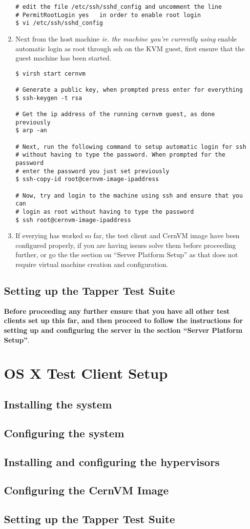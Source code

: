 \begin{enumerate}
\begin{lstlisting}
# edit the file /etc/ssh/sshd_config and uncomment the line 
# PermitRootLogin yes	in order to enable root login
$ vi /etc/ssh/sshd_config
\end{lstlisting}

\item Next from the host machine \emph{ie. the machine you're currently using} enable automatic login as root 
through ssh on the KVM guest, first ensure that the guest machine has been started.
\lstset{caption= Enable Automatic SSH Root Login}
\begin{lstlisting}
$ virsh start cernvm

# Generate a public key, when prompted press enter for everything
$ ssh-keygen -t rsa

# Get the ip address of the running cernvm guest, as done previously
$ arp -an

# Next, run the following command to setup automatic login for ssh
# without having to type the password. When prompted for the password
# enter the password you just set previously
$ ssh-copy-id root@cernvm-image-ipaddress
		
# Now, try and login to the machine using ssh and ensure that you can
# login as root without having to type the password
$ ssh root@cernvm-image-ipaddress
\end{lstlisting}

\item If everying has worked so far, the test client and CernVM image have been configured properly, if you are
having issues solve them before proceeding further, or go the the section on ``Server Platform Setup'' as that
does not require virtual machine creation and configuration.
\end{enumerate}

\subsection{Setting up the Tapper Test Suite}
\item {\bf Before proceeding any further ensure that you have all other test clients set up this far, and then proceed
to follow the instructions for setting up and configuring the \tapper server in the section ``Server Platform Setup''}.

\section{OS X Test Client Setup}
\subsection{Installing the system}
\subsection{Configuring the system}
\subsection{Installing and configuring the hypervisors}
\subsection{Configuring the CernVM Image}
\subsection{Setting up the Tapper Test Suite}